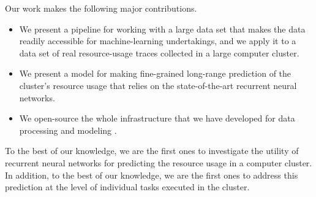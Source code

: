 Our work makes the following major contributions.
\begin{itemize}
\item We present a pipeline for working with a large data set that makes the
data readily accessible for machine-learning undertakings, and we apply it to a
data set of real resource-usage traces collected in a large computer cluster.

\item We present a model for making fine-grained long-range prediction of the
cluster's resource usage that relies on the state-of-the-art recurrent neural
networks.

\item We open-source the whole infrastructure that we have developed for data
processing and modeling \cite{sources}.
\end{itemize}

To the best of our knowledge, we are the first ones to investigate the utility
of recurrent neural networks for predicting the resource usage in a computer
cluster. In addition, to the best of our knowledge, we are the first ones to
address this prediction at the level of individual tasks executed in the
cluster.
